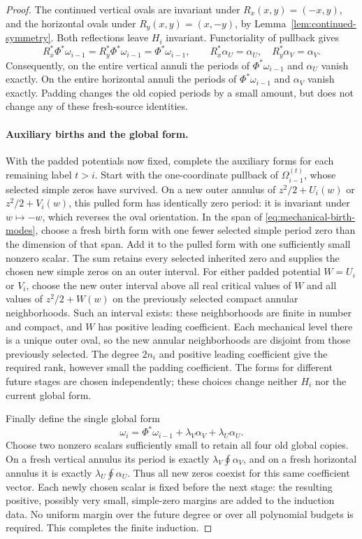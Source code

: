 \begin{proof}
The continued vertical ovals are invariant under
$R_x(x,y)=(-x,y)$, and the horizontal ovals under
$R_y(x,y)=(x,-y)$, by Lemma~\ref{lem:continued-symmetry}.  Both
reflections leave $H_i$ invariant.  Functoriality of pullback gives
\[
 R_x^*\Phi^*\omega_{i-1}=R_y^*\Phi^*\omega_{i-1}
 =\Phi^*\omega_{i-1},\qquad
 R_x^*\alpha_U=\alpha_U,\quad R_y^*\alpha_V=\alpha_V.
\]
Consequently, on the entire vertical annuli the periods of
$\Phi^*\omega_{i-1}$ and $\alpha_U$ vanish exactly.  On the entire
horizontal annuli the periods of $\Phi^*\omega_{i-1}$ and $\alpha_V$
vanish exactly.  Padding changes the old copied periods by a small
amount, but does not change any of these fresh-source identities.

\paragraph{Auxiliary births and the global form.}
With the padded potentials now fixed, complete the auxiliary forms for
each remaining label $t>i$.  Start with the one-coordinate pullback of
$\Omega_{i-1}^{(t)}$, whose selected simple zeros have survived.  On a
new outer annulus of $z^2/2+U_i(w)$ or $z^2/2+V_i(w)$, this pulled form
has identically zero period: it is invariant under $w\mapsto-w$,
which reverses the oval orientation.  In the span of \eqref{eq:mechanical-birth-modes}, choose a fresh birth
form with one fewer selected simple period zero than the dimension of
that span. Add it to the pulled form with one sufficiently small nonzero
scalar. The sum retains every selected inherited zero and supplies the
chosen new simple zeros on an outer interval.
For either padded potential $W=U_i$ or $V_i$, choose the new outer
interval above all real critical values of $W$ and all values of
$z^2/2+W(w)$ on the previously selected compact annular neighborhoods.
Such an interval exists: these neighborhoods are finite in number and
compact, and $W$ has positive leading coefficient. Each mechanical level
there is a unique outer oval, so the new annular neighborhoods are disjoint
from those previously selected. The degree $2n_i$ and positive leading
coefficient give the required rank, however small the padding coefficient.
The forms for different future stages are chosen independently; these
choices change neither $H_i$ nor the current global form.

Finally define the single global form
\begin{equation}\label{eq:mechanical-global-form}
 \omega_i=\Phi^*\omega_{i-1}
                  +\lambda_V\alpha_V+\lambda_U\alpha_U.
\end{equation}
Choose two nonzero scalars sufficiently small to retain all four old
global copies.  On a fresh vertical annulus its period is exactly
$\lambda_V\oint\alpha_V$, and on a fresh horizontal annulus it is
exactly $\lambda_U\oint\alpha_U$.  Thus all new zeros coexist for this
same coefficient vector.  Each newly chosen scalar is fixed before
the next stage: the resulting positive, possibly very small, simple-zero
margins are added to the induction data.  No uniform margin over the
future degree or over all polynomial budgets is required.  This completes the finite induction.


\end{proof}
